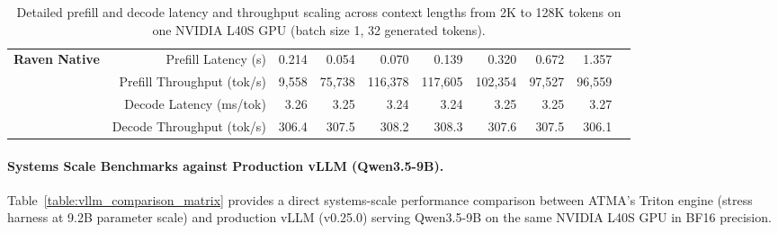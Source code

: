 \documentclass{article} %
\begin{document}
\begin{table}[h!]
{\begin{tabular}{lrrrrrrrrr}
\midrule
\textbf{Raven Native} & Prefill Latency (s) & 0.214 & 0.054 & 0.070 & 0.139 & 0.320 & 0.672 & 1.357 \\
 & Prefill Throughput (tok/s) & 9,558 & 75,738 & 116,378 & 117,605 & 102,354 & 97,527 & 96,559 \\
 & Decode Latency (ms/tok) & 3.26 & 3.25 & 3.24 & 3.24 & 3.25 & 3.25 & 3.27 \\
 & Decode Throughput (tok/s) & 306.4 & 307.5 & 308.2 & 308.3 & 307.6 & 307.5 & 306.1 \\
\bottomrule
\end{tabular}
}
\caption{Detailed prefill and decode latency and throughput scaling across context lengths from 2K to 128K tokens on one NVIDIA L40S GPU (batch size 1, 32 generated tokens).}
\label{table:serving_detailed_matrix}
\end{table}

\paragraph{Systems Scale Benchmarks against Production vLLM (Qwen3.5-9B).}
Table~\ref{table:vllm_comparison_matrix} provides a direct systems-scale performance comparison between ATMA's Triton engine (stress harness at 9.2B parameter scale) and production vLLM (v0.25.0) serving Qwen3.5-9B on the same NVIDIA L40S GPU in BF16 precision.
\end{document}
